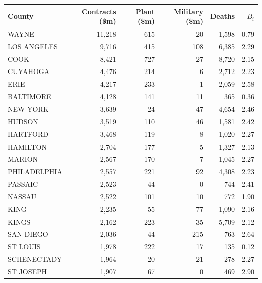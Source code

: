 \begin{tabular}{lrrrrr}
\toprule
County & Contracts (\$m) & Plant (\$m) & Military (\$m) & Deaths & $B_i$ \\
\midrule
WAYNE & 11,218 & 615 & 20 & 1,598 & 0.79 \\
LOS ANGELES & 9,716 & 415 & 108 & 6,385 & 2.29 \\
COOK & 8,421 & 727 & 27 & 8,720 & 2.15 \\
CUYAHOGA & 4,476 & 214 & 6 & 2,712 & 2.23 \\
ERIE & 4,217 & 233 & 1 & 2,059 & 2.58 \\
BALTIMORE & 4,128 & 141 & 11 & 365 & 0.36 \\
NEW YORK & 3,639 & 24 & 47 & 4,654 & 2.46 \\
HUDSON & 3,519 & 110 & 46 & 1,581 & 2.42 \\
HARTFORD & 3,468 & 119 & 8 & 1,020 & 2.27 \\
HAMILTON & 2,704 & 177 & 5 & 1,327 & 2.13 \\
MARION & 2,567 & 170 & 7 & 1,045 & 2.27 \\
PHILADELPHIA & 2,557 & 221 & 92 & 4,308 & 2.23 \\
PASSAIC & 2,523 & 44 & 0 & 744 & 2.41 \\
NASSAU & 2,522 & 101 & 10 & 772 & 1.90 \\
KING & 2,235 & 55 & 77 & 1,090 & 2.16 \\
KINGS & 2,162 & 223 & 35 & 5,709 & 2.12 \\
SAN DIEGO & 2,036 & 44 & 215 & 763 & 2.64 \\
ST LOUIS & 1,978 & 222 & 17 & 135 & 0.12 \\
SCHENECTADY & 1,964 & 20 & 21 & 278 & 2.27 \\
ST JOSEPH & 1,907 & 67 & 0 & 469 & 2.90 \\
\bottomrule
\end{tabular}